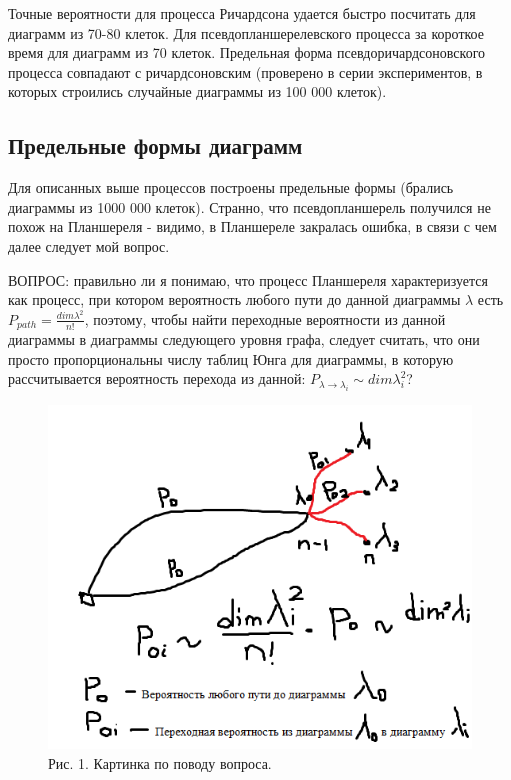 \documentclass[12pt]{report}
\begin{document}
Точные вероятности для процесса Ричардсона удается быстро посчитать для диаграмм из 70-80 клеток. Для псевдопланшерелевского процесса за короткое время для диаграмм из 70 клеток. Предельная форма псевдоричардсоновского процесса совпадают с ричардсоновским (проверено в серии экспериментов, в которых строились случайные диаграммы из 100 000 клеток).

\subsection*{Предельные формы диаграмм}

\hspace{\parindent} Для описанных выше процессов построены предельные формы (брались диаграммы из 1000 000 клеток). Странно, что псевдопланшерель получился не похож на Планшереля - видимо, в Планшереле закралась ошибка, в связи с чем далее следует мой вопрос.

ВОПРОС: правильно ли я понимаю, что процесс Планшереля характеризуется как процесс, при котором вероятность любого пути до данной диаграммы $\lambda$ есть $P_{path} = \frac{dim\lambda ^2}{n!}$, поэтому, чтобы найти переходные вероятности из данной диаграммы в диаграммы следующего уровня графа, следует считать, что они просто пропорциональны числу таблиц Юнга для диаграммы, в которую рассчитывается вероятность перехода из данной: $P_{\lambda \rightarrow \lambda_i} \sim dim\lambda_i^2$? 

\begin{figure}[!ht]
\begin{center}
\includegraphics[scale=0.6]{howIUnderstand}
\\Рис. 1. Картинка по поводу вопроса.
\end{center}
\end{figure}
\end{document}
